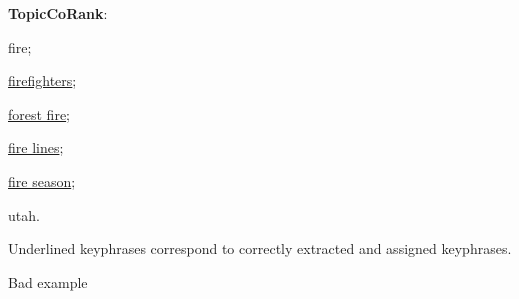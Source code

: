 {\begin{center}
\begin{varwidth}{.9\linewidth}
            \textbf{TopicCoRank}:
            \begin{enumerate*}
                \item{fire;}
                \item{\underline{firefighters};}
                \item{\underline{forest fire};}
                \item{\underline{fire lines};}
                \item{\underline{fire season};}
                \item{utah}.
            \end{enumerate*}
        \end{varwidth}
    \end{center}
    Underlined keyphrases correspond to correctly extracted and assigned keyphrases.}{Bad example}
